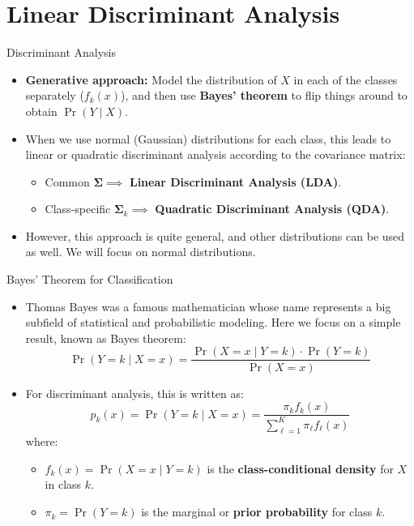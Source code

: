 \documentclass[aspectratio=169, 11pt]{beamer}
\begin{document}
\section{Linear Discriminant Analysis}

\begin{frame}{Discriminant Analysis}
  \begin{itemize}
    \item \textbf{Generative approach:} Model the distribution of $X$ in each of the classes separately ($f_k(x)$), and then use \textbf{Bayes' theorem} to flip things around to obtain $\Pr(Y \mid X)$.
    \item When we use normal (Gaussian) distributions for each class, this leads to linear or quadratic discriminant analysis according to the covariance matrix:
    \begin{itemize}
      \item Common  $\mathbf{\Sigma} \implies$ \textbf{Linear Discriminant Analysis (LDA)}.
      \item Class-specific  $\mathbf{\Sigma}_k \implies$ \textbf{Quadratic Discriminant Analysis (QDA)}.
    \end{itemize}
    \item However, this approach is quite general, and other distributions can be used as well. We will focus on normal distributions.
  \end{itemize}
\end{frame}


\begin{frame}{Bayes' Theorem for Classification}
  \begin{itemize}
    \item Thomas Bayes was a famous mathematician whose name represents a big subfield of statistical and probabilistic modeling. Here we focus on a simple result, known as Bayes theorem:
      \[
        \Pr(Y = k \mid X = x) = \frac{\Pr(X = x \mid Y = k) \cdot \Pr(Y = k)}{\Pr(X = x)}
      \]
    \item For discriminant analysis, this is written as:
      \[
        p_k(x) = \Pr(Y = k \mid X = x) = \frac{\pi_k f_k(x)}{\sum_{\ell=1}^K \pi_\ell f_\ell(x)}
      \]
      where:
      \begin{itemize}
        \item $f_k(x) = \Pr(X = x \mid Y = k)$ is the \textbf{class-conditional density} for $X$ in class $k$.
        \item $\pi_k = \Pr(Y = k)$ is the marginal or \textbf{prior probability} for class $k$.
      \end{itemize}
  \end{itemize}
\end{frame}
\end{document}
